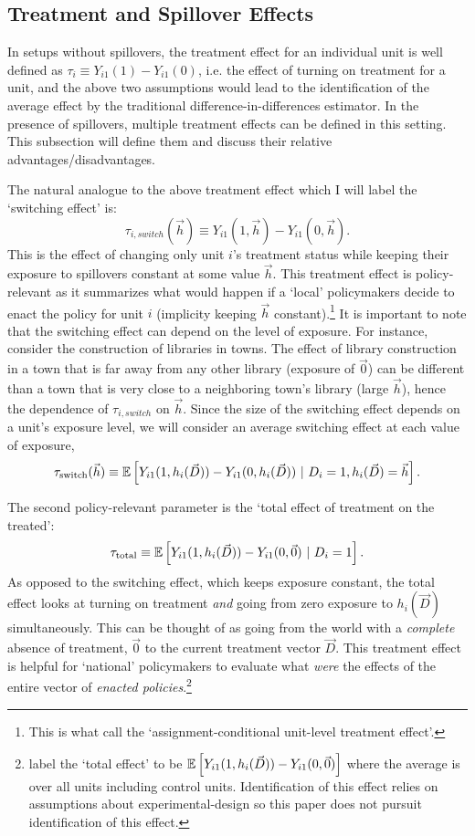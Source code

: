 \documentclass[11pt]{article}
\begin{document}
\subsection{Treatment and Spillover Effects}

In setups without spillovers, the treatment effect for an individual unit is well defined as $\tau_i \equiv Y_{i1}(1) - Y_{i1}(0)$, i.e. the effect of turning on treatment for a unit, and the above two assumptions would lead to the identification of the average effect by the traditional difference-in-differences estimator. In the presence of spillovers, multiple treatment effects can be defined in this setting. This subsection will define them and discuss their relative advantages/disadvantages. 

The natural analogue to the above treatment effect which I will label the `switching effect' is:
\[
    \tau_{i, switch}(\vec{h}) \equiv Y_{i1}(1, \vec{h}) - Y_{i1}(0, \vec{h}).
\] 
This is the effect of changing only unit $i$'s treatment status while keeping their exposure to spillovers constant at some value $\vec{h}$. This treatment effect is policy-relevant as it summarizes what would happen if a `local' policymakers decide to enact the policy for unit $i$ (implicity keeping $\vec{h}$ constant).\footnote{This is what \citet{Savje_Aronow_Hudgens_2021} call the `assignment-conditional unit-level treatment effect'.} It is important to note that the switching effect can depend on the level of exposure. For instance, consider the construction of libraries in towns. The effect of library construction in a town that is far away from any other library (exposure of $\vec{0}$) can be different than a town that is very close to a neighboring town's library (large $\vec{h}$), hence the dependence of $\tau_{i, switch}$ on $\vec{h}$. Since the size of the switching effect depends on a unit's exposure level, we will consider an average switching effect at each value of exposure, 
\[
    \tau_{\text{switch}}(\vec{h}) \equiv \mathbb{E}\left[Y_{i1}(1, h_i(\vec{D})) - Y_{i1}(0, h_i(\vec{D})) \ \vert \ D_i = 1, h_i(\vec{D}) = \vec{h}\right].
\]

The second policy-relevant parameter is the `total effect of treatment on the treated': 
\[
    \tau_{\text{total}} \equiv \mathbb{E}\left[Y_{i1}(1, h_i(\vec{D})) - Y_{i1}(0, \vec{0}) \ \vert \ D_i = 1\right].
\] 
As opposed to the switching effect, which keeps exposure constant, the total effect looks at turning on treatment \emph{and} going from zero exposure to $h_i(\vec{D})$ simultaneously. This can be thought of as going from the world with a \emph{complete} absence of treatment, $\vec{0}$ to the current treatment vector $\vec{D}$. This treatment effect is helpful for `national' policymakers to evaluate what \emph{were} the effects of the entire vector of \emph{enacted policies}.\footnote{\citet{yu2022estimating} label the `total effect' to be $\mathbb{E}\left[Y_{i1}(1, h_i(\vec{D})) - Y_{i1}(0, \vec{0})\right]$ where the average is over all units including control units. Identification of this effect relies on assumptions about experimental-design so this paper does not pursuit identification of this effect.}
\end{document}
